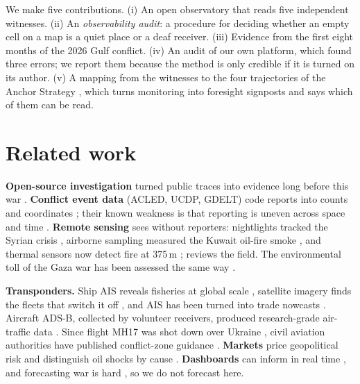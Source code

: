 \documentclass[10pt,twocolumn,letterpaper]{article}
\begin{document}
We make five contributions. (i) An open observatory that reads five independent witnesses. (ii) An \emph{observability audit}: a procedure for deciding whether an empty cell on a map is a quiet place or a deaf receiver. (iii) Evidence from the first eight months of the 2026 Gulf conflict. (iv) An audit of our own platform, which found three errors; we report them because the method is only credible if it is turned on its author. (v) A mapping from the witnesses to the four trajectories of the Anchor Strategy \citep{thiengburanathum2026anchor}, which turns monitoring into foresight signposts and says which of them can be read.

\section{Related work}
\textbf{Open-source investigation} turned public traces into evidence long before this war \citep{higgins2021bellingcat}. \textbf{Conflict event data} (ACLED, UCDP, GDELT) code reports into counts and coordinates \citep{raleigh2010acled,sundberg2013ucdp,leetaru2013gdelt}; their known weakness is that reporting is uneven across space and time \citep{weidmann2016reporting}. \textbf{Remote sensing} sees without reporters: nightlights tracked the Syrian crisis \citep{li2014nightlights}, airborne sampling measured the Kuwait oil-fire smoke \citep{hobbs1992kuwait}, and thermal sensors now detect fire at 375\,m \citep{schroeder2014viirs}; \citet{witmer2015remote} reviews the field. The environmental toll of the Gaza war has been assessed the same way \citep{unep2024gaza}.

\textbf{Transponders.} Ship AIS reveals fisheries at global scale \citep{kroodsma2018fisheries}, satellite imagery finds the fleets that switch it off \citep{park2020darkfleets}, and AIS has been turned into trade nowcasts \citep{cerdeiro2020seaborne}. Aircraft ADS-B, collected by volunteer receivers, produced research-grade air-traffic data \citep{schafer2014opensky,strohmeier2021opensky}. Since flight MH17 was shot down over Ukraine \citep{dsb2015mh17}, civil aviation authorities have published conflict-zone guidance \citep{icao2018doc10084,easa2026czib}. \textbf{Markets} price geopolitical risk \citep{caldara2022gpr} and distinguish oil shocks by cause \citep{kilian2009oil}. \textbf{Dashboards} can inform in real time \citep{dong2020covid}, and forecasting war is hard \citep{cederman2017predicting,hegre2019views}, so we do not forecast here.
\end{document}
